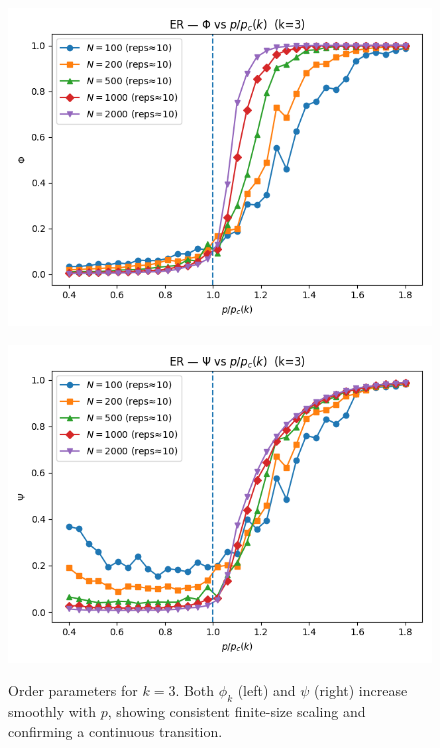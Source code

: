 \begin{figure}[h!]
    \centering
    \setlength{\tabcolsep}{2pt}
    \begin{minipage}[t]{0.48\textwidth}
        \centering
        \includegraphics[width=\textwidth]{images/IMAGES TASK2/ER_phi_k3.png}
        \label{fig:phi_k3}
    \end{minipage}
    \hfill
    \begin{minipage}[t]{0.48\textwidth}
        \centering
        \includegraphics[width=\textwidth]{images/IMAGES TASK2/ER_psi_k3.png}
        \label{fig:psi_k3}
    \end{minipage}
    \caption{Order parameters for $k=3$. 
    Both $\phi_k$ (left) and $\psi$ (right) increase smoothly with $p$, 
    showing consistent finite-size scaling and confirming a continuous transition.}
    \label{fig:orderparam_k3}
\end{figure}

